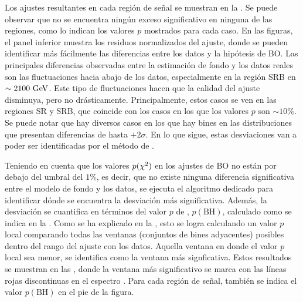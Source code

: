 Los ajustes resultantes en cada región de señal se muestran en la \Fig{\ref{fig:results:results:bkgonly:fits}}. Se puede observar que no se encuentra ningún exceso significativo en ninguna de las regiones, como lo indican los valores \(p\) mostrados para cada caso. En las figuras, el panel inferior muestra los residuos normalizados del ajuste, donde se pueden identificar más fácilmente las diferencias entre los datos y la hipótesis de \ac{BO}. Las principales diferencias observadas entre la estimación de fondo y los datos reales son las fluctuaciones hacia abajo de los datos, especialmente en la región SRB en \(\sim 2100~\text{GeV}\). Este tipo de fluctuaciones hacen que la calidad del ajuste disminuya, pero no drásticamente. Principalmente, estos casos se ven en las regiones SR y SRB, que coincide con los casos en los que los valores \(p\) son \(\sim 10\%\).
Se puede notar que hay diversos casos en los que hay bines en las distribuciones que presentan diferencias de hasta \(+2\sigma\). En lo que sigue, estas desviaciones van a poder ser identificadas por el método de \bh.


Teniendo en cuenta que los valores \(p(\chi^{2})\) en los ajustes de \ac{BO} no están por debajo del umbral del \(1\%\), es decir, que no existe ninguna diferencia significativa entre el modelo de fondo y los datos, se ejecuta el algoritmo dedicado \bh para identificar dónde se encuentra la desviación más significativa. Además, la desviación se cuantifica en términos del valor \(p\) de \bh, \(p \left(\text{BH}\right)\), calculado como se indica en la \Eqn{\ref{eq:strategy:stat_treatment:bh:bh_pval}}. Como se ha explicado en la \Sect{\ref{subsec:strategy:stat_treatment:bh}}, esto se logra calculando un valor \(p\) local comparando todas las ventanas (conjuntos de bines adyacentes) posibles dentro del rango del ajuste con los datos. Aquella ventana en donde el valor \(p\) local sea menor, se identifica como la ventana más signficativa.
Estos resultados se muestran en las \Figrange{\ref{fig:results:results:bkgonly:bh:SR}}{\ref{fig:results:results:bkgonly:bh:SRB}}, donde la ventana más significativo se marca con las líneas rojas discontinuas en el espectro \myj. Para cada región de señal, también se indica el valor \(p \left(\text{BH}\right)\) en el pie de la figura.

